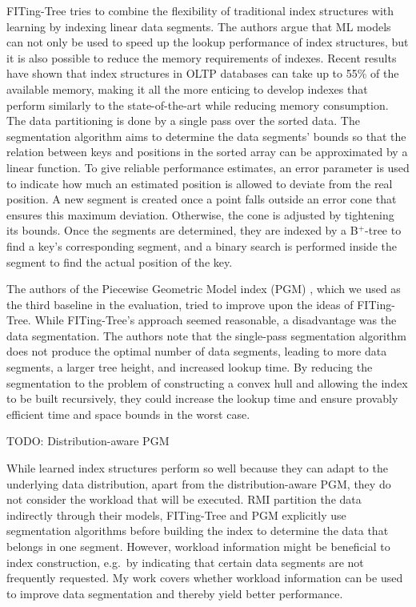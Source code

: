 FITing-Tree \cite{Galakatos2019} tries to combine the ﬂexibility of traditional index structures with learning by indexing linear data segments. The authors argue that ML models can not only be used to speed up the lookup performance of index structures, but it is also possible to reduce the memory requirements of indexes. Recent results \cite{Zhang2016} have shown that index structures in OLTP databases can take up to 55\% of the available memory, making it all the more enticing to develop indexes that perform similarly to the state-of-the-art while reducing memory consumption. The data partitioning is done by a single pass over the sorted data. The segmentation algorithm aims to determine the data segments' bounds so that the relation between keys and positions in the sorted array can be approximated by a linear function. To give reliable performance estimates, an error parameter is used to indicate how much an estimated position is allowed to deviate from the real position. A new segment is created once a point falls outside an error cone that ensures this maximum deviation. Otherwise, the cone is adjusted by tightening its bounds. Once the segments are determined, they are indexed by a B$^+$-tree to find a key's corresponding segment, and a binary search is performed inside the segment to find the actual position of the key.

The authors of the Piecewise Geometric Model index (PGM) \cite{Ferragina:2020pgm}, which we used as the third baseline in the evaluation, tried to improve upon the ideas of FITing-Tree. While FITing-Tree's approach seemed reasonable, a disadvantage was the data segmentation. The authors note that the single-pass segmentation algorithm does not produce the optimal number of data segments, leading to more data segments, a larger tree height, and increased lookup time. By reducing the segmentation to the problem of constructing a convex hull and allowing the index to be built recursively, they could increase the lookup time and ensure provably efficient time and space bounds in the worst case.

TODO: Distribution-aware PGM

While learned index structures perform so well because they can adapt to the underlying data distribution, apart from the distribution-aware PGM, they do not consider the workload that will be executed. RMI partition the data indirectly through their models, FITing-Tree and PGM explicitly use segmentation algorithms before building the index to determine the data that belongs in one segment. However, workload information might be beneficial to index construction, e.g.~by indicating that certain data segments are not frequently requested. My work covers whether workload information can be used to improve data segmentation and thereby yield better performance.

